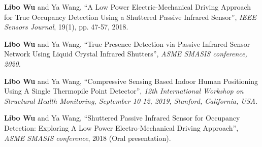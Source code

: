 \begin{cvparagraph}
\begin{cvitems}
    \item{
        \textbf{Libo Wu}{ and Ya Wang, ``A Low Power Electric-Mechanical Driving Approach for True Occupancy Detection Using a Shuttered Passive Infrared Sensor'', \textit{IEEE Sensors Journal}, 19(1), pp. 47-57, 2018.}}
    \end{cvitems}
    \vspace{12pt}


\vspace{12pt}
\begin{cvitems}
    \setlength{\itemsep}{2pt}
      \item{
        \textbf{Libo Wu}{ and Ya Wang, ``True Presence Detection via Passive Infrared Sensor Network Using Liquid Crystal Infrared Shutters'', \textit{ASME SMASIS conference, 2020.}}}
      
      \item{
        \textbf{Libo Wu}{ and Ya Wang, ``Compressive Sensing Based Indoor Human Positioning Using A Single Thermopile Point Detector'', \textit{12th International Workshop on Structural Health Monitoring, September 10-12, 2019, Stanford, California, USA.}}}
      
      \item{
        \textbf{Libo Wu}{ and Ya Wang, ``Shuttered Passive Infrared Sensor for Occupancy Detection: Exploring A Low Power Electro-Mechanical Driving Approach'', \textit{ASME SMASIS conference}, 2018 (Oral presentation).}}    
      \end{cvitems}
      \vspace{8pt}

    
\end{cvparagraph}

